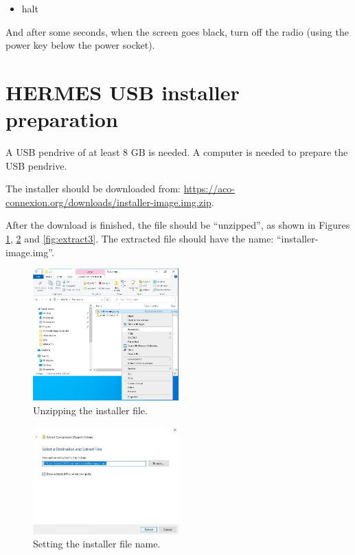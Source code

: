 \documentclass[11pt,a4paper]{article}
\begin{document}
\begin{itemize}
\item halt
\end{itemize}

And after some seconds, when the screen goes black, turn off the radio (using the power key below the power socket).


\section{HERMES USB installer preparation}

A USB pendrive of at least 8 GB is needed. A computer is needed to prepare the USB pendrive.

The installer should be downloaded from: \url{https://aco-connexion.org/downloads/installer-image.img.zip}.

After the download is finished, the file should be ``unzipped'', as shown in Figures \ref{fig:extract1}, \ref{fig:extract2}
and \ref{fig:extract3}.
The extracted file should have the name: ``installer-image.img''.

\begin{figure}[H]
  \centering
  \includegraphics[width=0.5\textwidth]{pictures/extract-1-ed.jpg}
  \caption{Unzipping the installer file.}
  \label{fig:extract1}
\end{figure}

\begin{figure}[H]
  \centering
  \includegraphics[width=0.5\textwidth]{pictures/extract-2-ed.jpg}
  \caption{Setting the installer file name.}
  \label{fig:extract2}
\end{figure}
\end{document}
